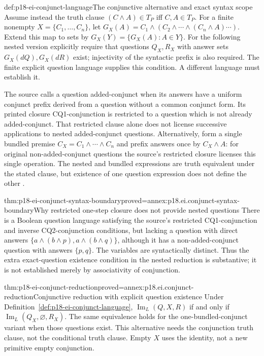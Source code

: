 \begin{hbdefinition}{def:p18-ei-conjunct-language}{The conjunctive alternative and exact syntax scope}
Assume instead the truth clause
\((C\land A)\in T_P\) iff \(C,A\in T_P\).
For a finite nonempty \(X=\{C_1,\ldots,C_n\}\), let
\(G_X(A)=C_1\land(C_2\land\cdots\land(C_n\land A)\cdots)\).
Extend this map to sets by \(G_X(Y)=\{G_X(A):A\in Y\}\).
For the following nested version explicitly require that questions
\(Q_X,R_X\) with answer sets \(G_X(dQ),G_X(dR)\) exist; injectivity
of the syntactic prefix is also required. The finite explicit question
language supplies this condition. A different language must establish it.

The source calls a question added-conjunct when its answers have a uniform
conjunct prefix derived from a question without a common conjunct form.
Its printed closure CQ1-conjunction is restricted to a question which is
not already added-conjunct. That restricted clause alone does not license
successive applications to nested added-conjunct questions. Alternatively,
form a single bundled premise \(C_X=C_1\land\cdots\land C_n\) and
prefix answers once by \(C_X\land A\): for original non-added-conjunct
questions the source's restricted closure licenses this single operation.
The nested and bundled expressions are truth equivalent under the stated
clause, but existence of one question expression does not define the other
\cite[pp.~305--307]{Wisniewski2018DeductionReduction}.
\end{hbdefinition}

\begin{hblemma}{thm:p18-ei-conjunct-syntax-boundary}{proved=annex:p18.ei.conjunct-syntax-boundary}{Why restricted one-step closure does not provide nested questions}
There is a Boolean question language satisfying the source's restricted
CQ1-conjunction and inverse CQ2-conjunction conditions, but lacking a
question with direct answers \(\{a\land(b\land p),a\land(b\land q)\}\),
although it has a non-added-conjunct question with answers \(\{p,q\}\).
The variables are syntactically distinct. Thus the extra exact-question
existence condition in the nested reduction is substantive; it is not
established merely by associativity of conjunction.
\end{hblemma}

\begin{hbtheorem}{thm:p18-ei-conjunct-reduction}{proved=annex:p18.ei.conjunct-reduction}{Conjunctive reduction with explicit question existence}
Under Definition~\ref{def:p18-ei-conjunct-language},
\(\operatorname{Im}_L(Q,X,R)\) if and only if
\(\operatorname{Im}_L(Q_X,\varnothing,R_X)\).
The same equivalence holds for the one-bundled-conjunct variant when those
questions exist. This alternative needs the conjunction truth clause, not
the conditional truth clause. Empty \(X\) uses the identity, not a new
primitive empty conjunction.
\end{hbtheorem}

